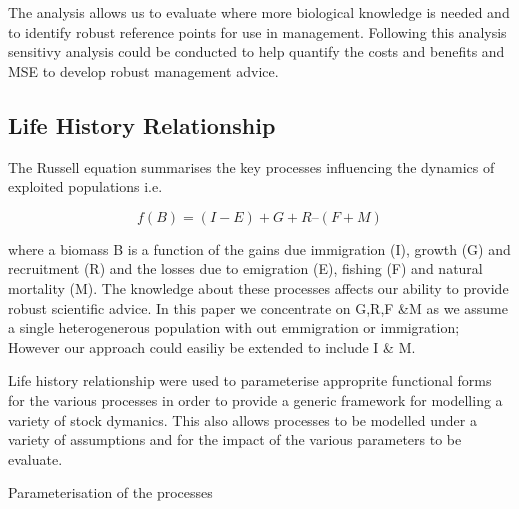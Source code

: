 \documentclass[10pt]{article}
\begin{document}
The analysis allows us to evaluate where more biological knowledge is needed and to identify robust reference points for use in management. Following this analysis
sensitivy analysis could be conducted to help quantify the costs and benefits and MSE to develop robust management advice.

\subsection{Life History Relationship}

The Russell equation \cite{russell1931some} summarises the key processes influencing the dynamics of exploited populations i.e.
 
\begin{equation}f(B) = (I-E) + G + R – (F+M)\end{equation}

where a biomass B is a function of the gains due immigration (I), growth (G) and recruitment (R) and the losses due to emigration (E), fishing (F) and natural 
mortality (M). The knowledge about these processes affects our ability to provide robust scientific advice. In this paper we concentrate 
on G,R,F \&M as we assume a single heterogenerous population with out emmigration or immigration; However our approach could easiliy be extended to include I \& M.

Life history relationship were used to parameterise approprite functional forms for the various processes in order to provide a generic framework for
modelling a variety of stock dymanics. This also allows processes to be modelled under a variety of assumptions and for the impact of the various parameters
to be evaluate.  

Parameterisation of the processes
\end{document}
